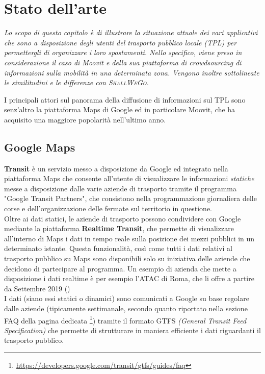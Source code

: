 \chapter{Stato dell'arte} %
%

\begin{citazione}
    \textit{Lo scopo di questo capitolo è di illustrare la situazione attuale dei vari applicativi che sono a disposizione degli utenti del trasporto pubblico locale (TPL) per permettergli di organizzare i loro spostamenti. Nello specifico, viene preso in considerazione il caso di Moovit e della sua piattaforma di crowdsourcing di informazioni sulla mobilità in una determinata zona. Vengono inoltre sottolineate le similitudini e le differenze con \textsc{ShallWeGo}.}
\end{citazione}

\newpage

I principali attori sul panorama della diffusione di informazioni sul TPL sono senz'altro la piattaforma Maps di Google ed in particolare Moovit, che ha acquisito una maggiore popolarità nell'ultimo anno.

\section{Google Maps}
    \textbf{Transit} è un servizio messo a disposizione da Google ed integrato nella piattaforma Maps che consente all'utente di visualizzare le informazioni \textit{statiche} messe a disposizione dalle varie aziende di trasporto tramite il programma "Google Transit Partners", che consistono nella programmazione giornaliera delle corse e dell'organizzazione delle fermate sul territorio in questione. \\
    Oltre ai dati statici, le aziende di trasporto possono condividere con Google mediante la piattaforma \textbf{Realtime Transit}, che permette di visualizzare all'interno di Maps i dati in tempo reale sulla posizione dei mezzi pubblici in un determinato istante. Questa funzionalità, così come tutti i dati relativi al trasporto pubblico su Maps sono disponibili solo su iniziativa delle aziende che decidono di partecipare al programma. Un esempio di azienda che mette a disposizione i dati realtime è per esempio l'ATAC di Roma, che li offre a partire da Settembre 2019 (\cite{atactransit})  \\
    I dati (siano essi statici o dinamici) sono comunicati a Google su base regolare dalle aziende (tipicamente settimanale, secondo quanto riportato nella sezione FAQ della pagina dedicata \footnote[3]{\url{https://developers.google.com/transit/gtfs/guides/faq}}) tramite il formato GTFS \textit{(General Transit Feed Specification)} che permette di strutturare in maniera efficiente i dati riguardanti il trasporto pubblico.

